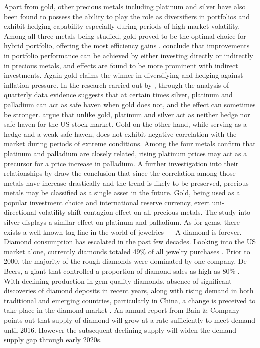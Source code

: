 \documentclass[preprint,authoryear,11pt]{elsarticle}
\begin{document}
\newline\newline
\noindent Apart from gold, other precious metals including platinum and silver have also been found to possess the ability to play the role as diversifiers in portfolios and exhibit hedging capability especially during periods of high market volatility. Among all three metals being studied, gold proved to be the optimal choice for hybrid portfolio, offering the most efficiency gains \citep{hillier_precious_2006}. \citet{conover_can_2009} conclude that improvements in portfolio performance can be achieved by either investing directly or indirectly in precious metals, and effects are found to be more prominent with indirect investments. Again gold claims the winner in diversifying and hedging against inflation pressure. In the research carried out by \citet{lucey_what_2013}, through the analysis of quarterly data evidence suggests that at certain times silver, platinum and palladium can act as safe haven when gold does not, and the effect can sometimes be stronger. \citet{hood_is_2013} argue that unlike gold, platinum and silver act as neither hedge nor safe haven for the US stock market. Gold on the other hand, while serving as a hedge and a weak safe haven, does not exhibit negative correlation with the market during periods of extreme conditions. Among the four metals \citet{sari_dynamics_2010} confirm that platinum and palladium are closely related, rising platinum prices may act as a precursor for a price increase in palladium. A further investigation into their relationships by \citet{sensoy_dynamic_2013} draw the conclusion that since the correlation among those metals have increase drastically and the trend is likely to be preserved, precious metals may be classified as a single asset in the future. Gold, being used as a popular investment choice and international reserve currency, exert uni-directional volatility shift contagion effect on all precious metals. The study into silver displays a similar effect on platinum and palladium.
\newline\newline
\noindent As for gems, there exists a well-known tag line in the world of jewelries --- A diamond is forever. Diamond consumption has escalated in the past few decades. Looking into the US market alone, currently diamonds totaled 49\% of all jewelry purchases \citet{webpage}. Prior to 2000, the majority of the rough diamonds were dominated by one company, De Beers, a giant that controlled a proportion of diamond sales as high as 80\% \citet{webpage}. With declining production in gem quality diamonds, absence of significant discoveries of diamond deposits in recent years, along with rising demand in both traditional and emerging countries, particularly in China, a change is preceived to take place in the diamond market \citet{webpage}. An annual report from Bain \& Company \citet{bain2013} points out that supply of diamond will grow at a rate sufficiently to meet demand until 2016. However the subsequent declining supply will widen the demand-supply gap through early 2020s.
\end{document}
